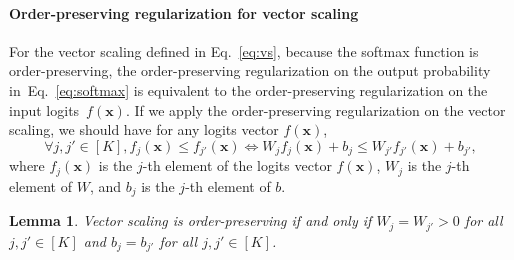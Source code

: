 \documentclass{article}
\newcommand{\1}{\mathbbm{1}}
\newcommand{\Eqref}[1]{Eq.~\eqref{#1}}
\theoremstyle{plain}
\newtheorem{lemma}[theorem]{Lemma}
\theoremstyle{definition}
\theoremstyle{remark}
\begin{document}
\paragraph{Order-preserving regularization for vector scaling}
For the vector scaling defined in \Eqref{eq:vs}, because the softmax function is order-preserving, the order-preserving regularization on the output probability in~\Eqref{eq:softmax} is equivalent to the order-preserving regularization on the input logits~\(f(\boldsymbol{x})\). If we apply the order-preserving regularization on the vector scaling, we should have for any logits vector \(f(\boldsymbol{x})\), 
\begin{equation*}
    \forall j, j'\in [K], f_{j}(\boldsymbol{x}) \leq f_{j'}(\boldsymbol{x}) \iff W_j f_{j}(\boldsymbol{x}) + b_j \leq W_{j'} f_{j'}(\boldsymbol{x}) + b_{j'},
\end{equation*}
where \(f_{j}(\boldsymbol{x})\) is the \(j\)-th element of the logits vector \(f(\boldsymbol{x})\), \(W_j\) is the \(j\)-th element of \(W\), and \(b_j\) is the \(j\)-th element of \(b\). 

\begin{lemma}
    \label{lemma:order_preserving_vector_scaling}
    Vector scaling is order-preserving if and only if \(W_j = W_{j'} >0\) for all \(j, j'\in [K]\) and \(b_j = b_{j'}\) for all \(j, j'\in [K]\).
\end{lemma}
\end{document}
